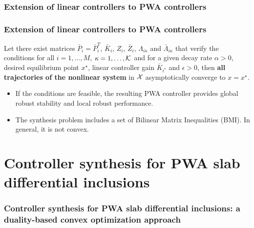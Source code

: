 \documentclass{beamer}
\newcommand{\KA}{{\cal K}}
\begin{document}
  \frame
  {
    \frametitle{Extension of linear controllers to PWA controllers}
    \centerline{}
  }

  \frame
  {
    \frametitle{Extension of linear controllers to PWA controllers}
\begin{theorem}[3.2]
Let there exist matrices $\bar P_i=\bar P_i^T$, $\bar K_i$, $Z_i$, $\bar Z_i$, $\Lambda_{i\kappa}$ and $\bar \Lambda_{i\kappa}$ that verify the conditions for all $i=1,\ldots,M$, $\kappa=1,\ldots,\KA$ and for a given decay rate $\alpha>0$, desired equilibrium point $x^\star$, linear controller gain $\bar K_{i^\star}$ and $\epsilon>0$, then \textbf{all trajectories of the nonlinear system} in $\cal X$ asymptotically converge to $x=x^\star$.
\end{theorem}
\begin{itemize}
\item<2-> If the conditions are feasible, the resulting PWA controller provides global robust stability and local robust performance.
\item<3-> The synthesis problem includes a set of Bilinear Matrix Inequalities (BMI). In general, it is not convex.
\end{itemize}
}  
 
  \section[Chapter 4]{Controller synthesis for PWA slab differential inclusions}
  \frame
  {
    \frametitle{Controller synthesis for PWA slab differential inclusions: a duality-based convex optimization approach}
    \centerline{}
  }
\end{document}
